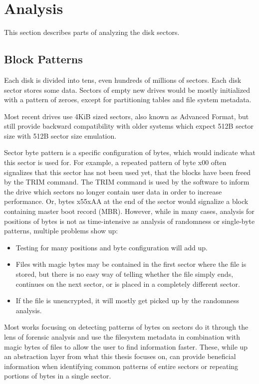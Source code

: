 \documentclass[
  digital, %
  oneside, %
  lof,     %
  lot,     %
]{fithesis4}
\begin{document}
\section{Analysis}
This section describes parts of analyzing the disk sectors.

\subsection{Block Patterns}
Each disk is divided into tens, even hundreds of millions of sectors.
Each disk sector stores some data.
Sectors of empty new drives would be mostly initialized with a pattern of zeroes, except for partitioning tables and file system metadata.

Most recent drives use 4KiB sized sectors, also known as Advanced Format, but still provide backward compatibility with older systems which expect 512B sector size with 512B sector size emulation.\cite{seagate}

Sector byte pattern is a specific configuration of bytes, which would indicate what this sector is used for.
For example, a repeated pattern of byte x00 often signalizes that this sector has not been used yet, that the blocks have been freed by the TRIM command.
The TRIM command is used by the software to inform the drive which sectors no longer contain user data in order to increase performance.\cite{mcmillen21}
Or, bytes x55xAA at the end of the sector would signalize a block containing master boot record (MBR).
However, while in many cases, analysis for positions of bytes is not as time-intensive as analysis of randomness or single-byte patterns, multiple problems show up:
\begin{itemize}
    \item Testing for many positions and byte configuration will add up.
    \item Files with magic bytes may be contained in the first sector where the file is stored, but there is no easy way of telling whether the file simply ends, continues on the next sector, or is placed in a completely different sector.
    \item If the file is unencrypted, it will mostly get picked up by the randomness analysis.
\end{itemize}

Most works focusing on detecting patterns of bytes on sectors\cite{foster12, garfmccar15} do it through the lens of forensic analysis and use the filesystem metadata in combination with magic bytes of files to allow the user to find information faster.
These, while up an abstraction layer from what this thesis focuses on, can provide beneficial information when identifying common patterns of entire sectors or repeating portions of bytes in a single sector.\cite{foster12}
\end{document}
